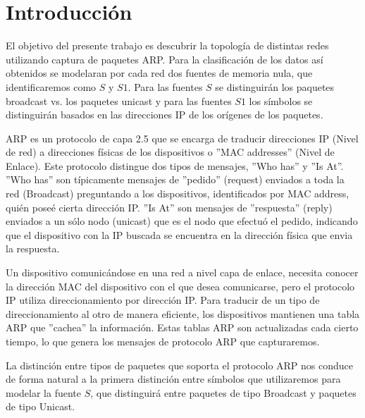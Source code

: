 \section{Introducción}



El objetivo del presente trabajo es descubrir la topología de distintas redes utilizando captura de paquetes ARP. Para la clasificación de los datos así obtenidos se modelaran por cada red dos fuentes de memoria nula, que identificaremos como $S$ y $S1$. Para las fuentes $S$ se distinguirán los paquetes broadcast vs. los paquetes unicast y para las fuentes $S1$ los símbolos se distinguirán basados en las direcciones IP de los orígenes de los paquetes.

ARP es un protocolo de capa 2.5 que se encarga de traducir direcciones IP (Nivel de red) a direcciones físicas de los dispositivos o ''MAC addresses'' (Nivel de Enlace). Este protocolo distingue dos tipos de mensajes, ''Who has'' y ''Is At''.
''Who has'' son típicamente mensajes de ''pedido'' (request) enviados a toda la red (Broadcast) preguntando a los dispositivos, identificados por MAC address, quién poseé cierta dirección IP.
''Is At'' son mensajes de ''respuesta'' (reply) enviados a un sólo nodo (unicast) que es el nodo que efectuó el pedido, indicando que el dispositivo con la IP buscada se encuentra en la dirección física que envia la respuesta.

Un dispositivo comunicándose en una red a nivel capa de enlace, necesita conocer la dirección MAC del dispositivo con el que desea comunicarse, pero el protocolo IP utiliza direccionamiento por dirección IP. Para traducir de un tipo de direccionamiento al otro de manera eficiente, los dispositivos mantienen una tabla ARP que ''cachea'' la información. Estas tablas ARP son actualizadas cada cierto tiempo, lo que genera los mensajes de protocolo ARP que capturaremos.

La distinción entre tipos de paquetes que soporta el protocolo ARP nos conduce de forma natural a la primera distinción entre símbolos que utilizaremos para modelar la fuente $S$, que distinguirá entre paquetes de tipo Broadcast y paquetes de tipo Unicast.


